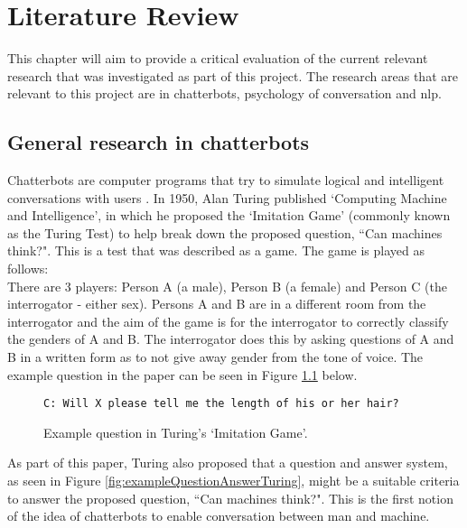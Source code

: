 \glsresetall
\chapter{Literature Review}
This chapter will aim to provide a critical evaluation of the current relevant research that was investigated as part of this project. The research areas that are relevant to this project are in chatterbots, psychology of conversation and \gls{nlp}.\\

\section{General research in chatterbots}
Chatterbots are computer programs that try to simulate logical and intelligent conversations with users \autocite{de2001unfriendly}. In 1950, Alan Turing published `Computing Machine and Intelligence', in which he proposed the `Imitation Game' (commonly known as the Turing Test) to help break down the proposed question, ``Can machines think?"\autocite{turing-paper1950}. This is a test that was described as a game. The game is played as follows:\\
There are 3 players: Person A (a male), Person B (a female) and Person C (the interrogator - either sex). Persons A and B are in a different room from the interrogator and the aim of the game is for the interrogator to correctly classify the genders of A and B. The interrogator does this by asking questions of A and B in a written form as to not give away gender from the tone of voice. The example question in the paper can be seen in Figure \ref{fig:exampleInterrogatorQuestion} below.\\
\begin{figure}[H]
	\centering
	\texttt{C: Will X please tell me the length of his or her hair?}
	
	\caption{Example question in Turing's `Imitation Game'. \autocite{turing-paper1950}}
	\label{fig:exampleInterrogatorQuestion}
\end{figure}
\noindent
As part of this paper, Turing also proposed that a question and answer system, as seen in Figure \ref{fig:exampleQuestionAnswerTuring}, might be a suitable criteria to answer the proposed question, ``Can machines think?". This is the first notion of the idea of chatterbots to enable conversation between man and machine.\\
